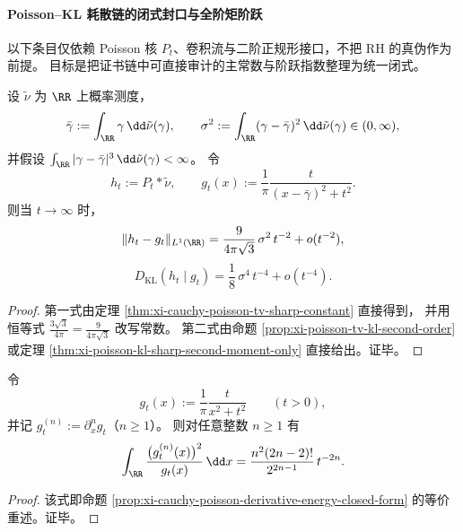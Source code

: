 \paragraph{Poisson--KL 耗散链的闭式封口与全阶矩阶跃}
以下条目仅依赖 Poisson 核 \(P_t\)、卷积流与二阶正规形接口，不把 RH 的真伪作为前提。
目标是把证书链中可直接审计的主常数与阶跃指数整理为统一闭式。

\begin{conclusion}[二阶正规形中的两处闭式常数]\label{con:xi-poisson-second-order-two-closed-constants}
设 \(\tilde\nu\) 为 \(\RR\) 上概率测度，
\[
\bar\gamma:=\int_{\RR}\gamma\,\dd\tilde\nu(\gamma),\qquad
\sigma^2:=\int_{\RR}(\gamma-\bar\gamma)^2\,\dd\tilde\nu(\gamma)\in(0,\infty),
\]
并假设
\(
\int_{\RR}|\gamma-\bar\gamma|^3\,\dd\tilde\nu(\gamma)<\infty
\)。
令
\[
h_t:=P_t*\tilde\nu,\qquad
g_t(x):=\frac{1}{\pi}\frac{t}{(x-\bar\gamma)^2+t^2}.
\]
则当 \(t\to\infty\) 时，
\[
\|h_t-g_t\|_{L^1(\RR)}
=\frac{9}{4\pi\sqrt3}\,\sigma^2\,t^{-2}+o(t^{-2}),
\]
\[
D_{\mathrm{KL}}(h_t\mid g_t)
=\frac18\,\sigma^4\,t^{-4}+o(t^{-4}).
\]
\end{conclusion}
\begin{proof}
第一式由定理 \ref{thm:xi-cauchy-poisson-tv-sharp-constant} 直接得到，
并用恒等式
\(
\frac{3\sqrt3}{4\pi}=\frac{9}{4\pi\sqrt3}
\)
改写常数。
第二式由命题 \ref{prop:xi-poisson-tv-kl-second-order}
或定理 \ref{thm:xi-poisson-kl-sharp-second-moment-only} 直接给出。证毕。
\end{proof}

\begin{conclusion}\label{con:xi-poisson-cauchy-derivative-chi2-all-orders}
令
\[
g_t(x):=\frac{1}{\pi}\frac{t}{x^2+t^2}\qquad(t>0),
\]
并记 \(g_t^{(n)}:=\partial_x^n g_t\)（\(n\ge1\)）。
则对任意整数 \(n\ge1\) 有
\[
\int_{\RR}\frac{\bigl(g_t^{(n)}(x)\bigr)^2}{g_t(x)}\,\dd x
=\frac{n^2(2n-2)!}{2^{2n-1}}\,t^{-2n}.
\]
\end{conclusion}
\begin{proof}
该式即命题 \ref{prop:xi-cauchy-poisson-derivative-energy-closed-form}
的等价重述。证毕。
\end{proof}

